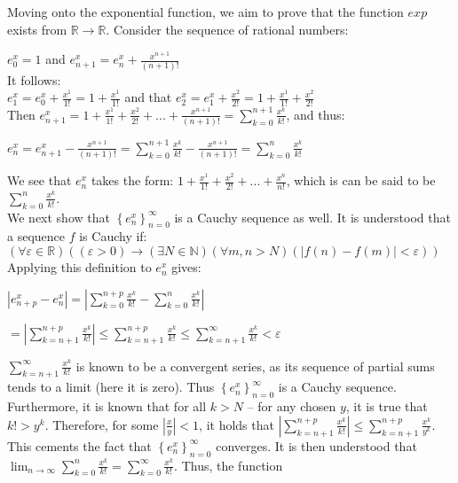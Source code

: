 \documentclass[12pt]{article}
\newcommand{\N}{\mathbb{N}}
\newcommand{\R}{\mathbb{R}}
\newcommand{\ep}{\varepsilon}
\newcommand{\set}[1]{\left\{ #1\right\}}
\begin{document}
Moving onto the exponential function, we aim to prove that the function $exp$ exists from $\R \rightarrow \R$. Consider the sequence of rational numbers: 

$e_0^x = 1$ and $e_{n+1}^x = e_n^x + \frac{x^{n+1}}{(n+1)!}$\\

It follows:\\

$e_1^x = e_0^x + \frac{x^1}{1!} = 1 + \frac{x^1}{1!}$ and that 
$e_2^x = e_1^x + \frac{x^2}{2!} = 1 + \frac{x^1}{1!} + \frac{x^2}{2!}$\\

Then $e_{n+1}^x = 1 + \frac{x^1}{1!} + \frac{x^2}{2!} + ... + \frac{x^{n+1}}{(n+1)!} = \sum_{k=0}^{n+1} \frac{x^k}{k!}$, and thus:

$e_n^x = e_{n+1}^x - \frac{x^{n+1}}{(n+1)!} = \sum_{k=0}^{n+1} \frac{x^k}{k!} - \frac{x^{n+1}}{(n+1)!} = \sum_{k=0}^{n} \frac{x^k}{k!}$



We see that $e_n^x$ takes the form: $1 + \frac{x^1}{1!} + \frac{x^2}{2!} + ... + \frac{x^n}{n!}$, which is can be said to be $\sum_{k=0}^n \frac{x^k}{k!}$. \\

We next show that $\set{e_n^x}_{n=0}^\infty$ is a Cauchy sequence as well. It is understood that a sequence $f$ is Cauchy if:\\
$(\forall \ep \in \R)((\ep > 0) \rightarrow (\exists N \in \N)(\forall m,n > N)(|f(n) - f(m)| < \ep))$\\

Applying this definition to ${e_n^x}$ gives:

$|e_{n+p}^x - e_n^x| = |\sum_{k=0}^{n+p}\frac{x^k}{k!} - \sum_{k=0}^{n}\frac{x^k}{k!}|$

$= |\sum_{k=n+1}^{n+p}\frac{x^k}{k!}| \leq \sum_{k=n+1}^{n+p}\frac{x^k}{k!} \leq \sum_{k=n+1}^\infty \frac{x^k}{k!} < \ep$

$\sum_{k=n+1}^\infty \frac{x^k}{k!}$ is known to be a convergent series, as its sequence of partial sums tends to a limit (here it is zero). Thus $\set{e_n^x}_{n=0}^\infty$ is a Cauchy sequence.\\

Furthermore, it is known that for all $k > N$ -- for any chosen $y$, it is true that $k! > y^k$. Therefore, for some $|\frac{x}{y}| < 1$, it holds that $|\sum_{k=n+1}^{n+p}\frac{x^k}{k!}| \leq \sum_{k=n+1}^{n+p}\frac{x^k}{y^k}$. This cements the fact that $\set{e_n^x}_{n=0}^\infty$ converges. It is then understood that $\lim_{n \rightarrow \infty} \sum_{k=0}^{n}\frac{x^k}{k!} = \sum_{k=0}^\infty \frac{x^k}{k!}$.
Thus, the function 
\end{document}
